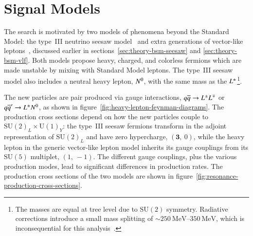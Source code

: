 \section{Signal Models}\label{sec:resonance-signal-models}
The search is motivated by two models of phenomena beyond the Standard Model: the type~III neutrino seesaw model~\cite{Biggio:1368793} and extra generations of vector-like leptons~\cite{Martin:2009it}, discussed earlier in sections~\ref{sec:theory-bsm-seesaw} and \ref{sec:theory-bsm-vlf}. Both models propose heavy, charged, and colorless fermions which are made unstable by mixing with Standard Model leptons. The type~III seesaw model also includes a neutral heavy lepton, $N^{0}$, with the same mass as the $L^{\pm}$\footnote{The masses are equal at tree level due to $\mathrm{SU}(2)$ symmetry. Radiative corrections introduce a small mass splitting of $\sim\SIrange[range-phrase=-]{250}{350}{\mega\electronvolt}$, which is inconsequential for this analysis~\cite{Frampton:1999kr}.}. 

The new particles are pair produced via gauge interactions, $q\overline{q}\rightarrow L^{\pm}L^{\mp}$ or $q\overline{q}'\rightarrow L^{\pm}N^{0}$, as shown in figure~\ref{fig:heavy-lepton-feynman-diagrams}. The production cross sections depend on how the new particles couple to $\mathrm{SU}(2)_L\times \mathrm{U}(1)_Y$: the type~III seesaw fermions transform in the adjoint representation of $\mathrm{SU}(2)_L$ and have zero hypercharge, $(\mathbf{3},\ 0)$, while the heavy lepton in the generic vector-like lepton model inherits its gauge couplings from its $\mathrm{SU}(5)$ multiplet, $(1,\ -1)$.  The different gauge couplings, plus the various production modes, lead to significant differences in production rates. The production cross sections of the two models are shown in figure~\ref{fig:resonance-production-cross-sections}.

